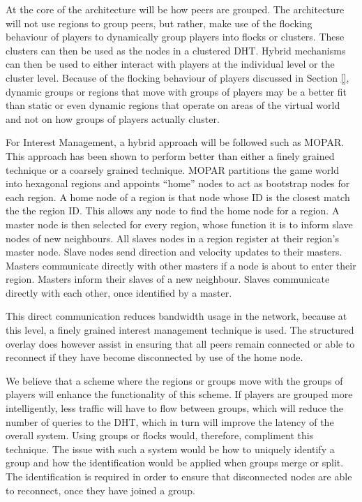 \documentclass[journal,oneside,a4paper,onecolumn]{IEEEtran}
\begin{document}
At the core of the architecture will be how peers are grouped. The architecture will not use regions to group peers, but rather, make use of the flocking behaviour of players to dynamically group players into flocks or clusters. These clusters can then be used as the nodes in a clustered \ac{DHT}. Hybrid mechanisms can then be used to either interact with players at the individual level or the cluster level. Because of the flocking behaviour of players discussed in Section \ref{}, dynamic groups or regions that move with groups of players may be a better fit than static or even dynamic regions that operate on areas of the virtual world and not on how groups of players actually cluster.

For Interest Management, a hybrid approach will be followed such as MOPAR. This approach has been shown to perform better than either a finely grained technique or a coarsely grained technique. MOPAR partitions the game world into hexagonal regions and appoints ``home'' nodes to act as bootstrap nodes for each region. A home node of a region is that node whose ID is the closest match the the region ID. This allows any node to find the home node for a region. A master node is then selected for every region, whose function it is to inform slave nodes of new neighbours. All slaves nodes in a region register at their region's master node. Slave nodes send direction and velocity updates to their masters. Masters communicate directly with other masters if a node is about to enter their region. Masters inform their slaves of a new neighbour. Slaves communicate directly with each other, once identified by a master.

This direct communication reduces bandwidth usage in the network, because at this level, a finely grained interest management technique is used. The structured overlay does however assist in ensuring that all peers remain connected or able to reconnect if they have become disconnected by use of the home node.

We believe that a scheme where the regions or groups move with the groups of players will enhance the functionality of this scheme. If players are grouped more intelligently, less traffic will have to flow between groups, which will reduce the number of queries to the DHT, which in turn will improve the latency of the overall system. Using groups or flocks would, therefore, compliment this technique. The issue with such a system would be how to uniquely identify a group and how the identification would be applied when groups merge or split. The identification is required in order to ensure that disconnected nodes are able to reconnect, once they have joined a group.
\end{document}
